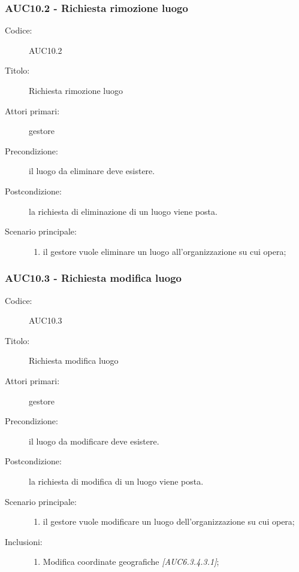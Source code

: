\documentclass[casi-duso]{subfiles}
\begin{document}
\subsubsection{AUC10.2 - Richiesta rimozione luogo}%
\label{subsub:AUC10.2}
\begin{description}
  \item[Codice:] AUC10.2
  \item[Titolo:] Richiesta rimozione luogo
  \item[Attori primari:] gestore
  \item[Precondizione:] il luogo da eliminare deve esistere.
  \item[Postcondizione:] la richiesta di eliminazione di un luogo viene posta.
  \item[Scenario principale:]
  \begin{enumerate}
    \item il gestore vuole eliminare un luogo all'organizzazione su cui opera;
  \end{enumerate}
\end{description}

\subsubsection{AUC10.3 - Richiesta modifica luogo}%
\label{subsub:AUC10.3}
\begin{description}
  \item[Codice:] AUC10.3
  \item[Titolo:] Richiesta modifica luogo
  \item[Attori primari:] gestore
  \item[Precondizione:] il luogo da modificare deve esistere.
  \item[Postcondizione:] la richiesta di modifica di un luogo viene posta.
  \item[Scenario principale:]
  \begin{enumerate}
    \item il gestore vuole modificare un luogo dell'organizzazione su cui opera;
  \end{enumerate}
  \item[Inclusioni:]
  \begin{enumerate}
    \item Modifica coordinate geografiche \emph{[AUC6.3.4.3.1]};
  \end{enumerate}
\end{description}
\end{document}
